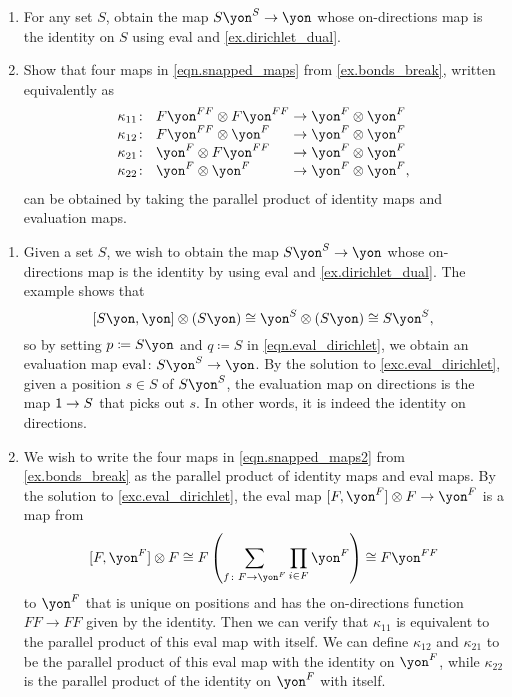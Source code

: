 \documentclass[Book-Poly]{subfiles}
\begin{document}
\begin{exercise}
\begin{enumerate}
	\item For any set $S$, obtain the map $S\yon^S\to\yon$ whose on-directions map is the identity on $S$ using eval and \cref{ex.dirichlet_dual}.
	\item Show that four maps in \eqref{eqn.snapped_maps} from \cref{ex.bonds_break}, written equivalently as
	\begin{equation} \label{eqn.snapped_maps2}
	\arraycolsep=1.4pt
    \begin{array}{lll}
    	\kappa_{11}\colon&~ F\yon^{FF}\otimes F\yon^{FF}&\to\yon^F\otimes\yon^F\\
    	\kappa_{12}\colon&~ F\yon^{FF}\otimes \yon^F&\to\yon^F\otimes\yon^F\\
    	\kappa_{21}\colon&~ \yon^F\otimes F\yon^{FF}&\to\yon^F\otimes\yon^F\\
    	\kappa_{22}\colon&~ \yon^F\otimes\yon^F&\to\yon^F\otimes\yon^F,
    \end{array}
	\end{equation}
	can be obtained by taking the parallel product of identity maps and evaluation maps.
\qedhere
\end{enumerate}
\begin{solution}
\begin{enumerate}
    \item Given a set $S$, we wish to obtain the map $S\yon^S \to \yon$ whose on-directions map is the identity by using eval and \cref{ex.dirichlet_dual}.
    The example shows that
    \[
        \ihom{S\yon, \yon} \otimes (S\yon) \iso \yon^S \otimes (S\yon) \iso S\yon^S,
    \]
    so by setting $p \coloneqq S\yon$ and $q \coloneqq S$ in \eqref{eqn.eval_dirichlet}, we obtain an evaluation map $\fun{eval} \colon S\yon^S \to \yon$.
    By the solution to \cref{exc.eval_dirichlet}, given a position $s \in S$ of $S\yon^S$, the evaluation map on directions is the map $\textsf{1} \to S$ that picks out $s$.
    In other words, it is indeed the identity on directions.
    \item We wish to write the four maps in \eqref{eqn.snapped_maps2} from \cref{ex.bonds_break} as the parallel product of identity maps and eval maps.
    By the solution to \cref{exc.eval_dirichlet}, the eval map $\ihom{F,\yon^F}\otimes F\to\yon^F$
    is a map from
    \[
        \ihom{F,\yon^F}\otimes F\iso F\left(\sum_{f\colon F\to\yon^F}\prod_{i\in F}\yon^F\right)\iso F\yon^{FF}
    \]
    to $\yon^F$ that is unique on positions and has the on-directions function $FF\to FF$ given by the identity.
    Then we can verify that $\kappa_{11}$ is equivalent to the parallel product of this eval map with itself.
    We can define $\kappa_{12}$ and $\kappa_{21}$ to be the parallel product of this eval map with the identity on $\yon^F$, while $\kappa_{22}$ is the parallel product of the identity on $\yon^F$ with itself.
\end{enumerate}
\end{solution}
\end{exercise}
\end{document}
